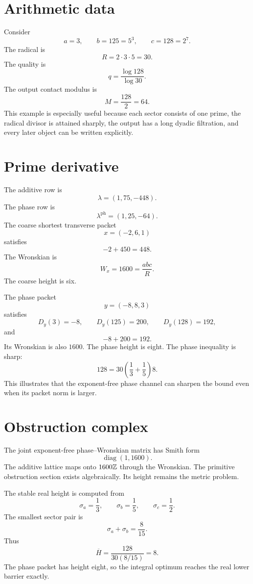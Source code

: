 \appendix
{}

\section{Arithmetic data}
Consider
\[
 a=3,
 \qquad
 b=125=5^3,
 \qquad
 c=128=2^7.
\]
The radical is
\[
 R=2\cdot3\cdot5=30.
\]
The quality is
\[
 q=\frac{\log128}{\log30}.
\]
The output contact modulus is
\[
 M=\frac{128}{2}=64.
\]
This example is especially useful because each sector consists of one prime, the radical divisor is attained sharply, the output has a long dyadic filtration, and every later object can be written explicitly.

\section{Prime derivative}
The additive row is
\[
 \lambda=(1,75,-448).
\]
The phase row is
\[
 \lambda^{\mathrm{ph}}=(1,25,-64).
\]
The coarse shortest transverse packet
\[
 x=(-2,6,1)
\]
satisfies
\[
 -2+450=448.
\]
The Wronskian is
\[
 W_x=1600=\frac{abc}{R}.
\]
The coarse height is six.

The phase packet
\[
 y=(-8,8,3)
\]
satisfies
\[
 D_y(3)=-8,
 \qquad
 D_y(125)=200,
 \qquad
 D_y(128)=192,
\]
and
\[
 -8+200=192.
\]
Its Wronskian is also $1600$. The phase height is eight. The phase inequality is sharp:
\[
 128
 =
 30\left(\frac13+\frac15\right)8.
\]
This illustrates that the exponent-free phase channel can sharpen the bound even when its packet norm is larger.

\section{Obstruction complex}
The joint exponent-free phase--Wronskian matrix has Smith form
\[
 \operatorname{diag}(1,1600).
\]
The additive lattice maps onto $1600\mathbb Z$ through the Wronskian. The primitive obstruction section exists algebraically. Its height remains the metric problem.

The stable real height is computed from
\[
 \sigma_a=\frac13,
 \qquad
 \sigma_b=\frac15,
 \qquad
 \sigma_c=\frac12.
\]
The smallest sector pair is
\[
 \sigma_a+\sigma_b=\frac8{15}.
\]
Thus
\[
 \overline H
 =
 \frac{128}{30(8/15)}
 =8.
\]
The phase packet has height eight, so the integral optimum reaches the real lower barrier exactly.

